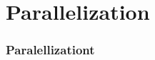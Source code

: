 \section{Parallelization}
\label{sec:parllel}

\begin{frame}
    \frametitle{Paralellizationt}
    

\end{frame}